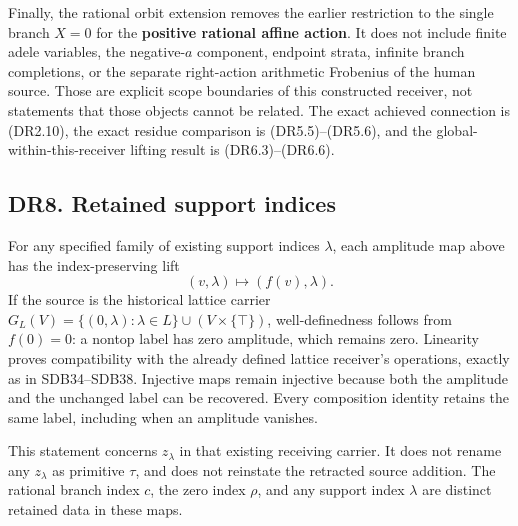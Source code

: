 Finally, the rational orbit extension removes the earlier restriction to
the single branch \(X=0\) for the \textbf{positive rational affine
action}. It does not include finite adele variables, the negative-\(a\)
component, endpoint strata, infinite branch completions, or the separate
right-action arithmetic Frobenius of the human source. Those are
explicit scope boundaries of this constructed receiver, not statements
that those objects cannot be related. The exact achieved connection is
(DR2.10), the exact residue comparison is (DR5.5)--(DR5.6), and the
global-within-this-receiver lifting result is (DR6.3)--(DR6.6).

\subsection{DR8. Retained support
indices}\label{dr8.-retained-support-indices}

For any specified family of existing support indices \(\lambda\), each
amplitude map above has the index-preserving lift \[
 (v,\lambda)\longmapsto(f(v),\lambda).
\tag{DR8.1}
\] If the source is the historical lattice carrier
\(G_L(V)=\{(0,\lambda):\lambda\in L\}\cup(V\times\{\top\})\),
well-definedness follows from \(f(0)=0\): a nontop label has zero
amplitude, which remains zero. Linearity proves compatibility with the
already defined lattice receiver's operations, exactly as in
SDB34--SDB38. Injective maps remain injective because both the amplitude
and the unchanged label can be recovered. Every composition identity
retains the same label, including when an amplitude vanishes.

This statement concerns \(z_\lambda\) in that existing receiving
carrier. It does not rename any \(z_\lambda\) as primitive \(\tau\), and
does not reinstate the retracted source addition. The rational branch
index \(c\), the zero index \(\rho\), and any support index \(\lambda\)
are distinct retained data in these maps.
